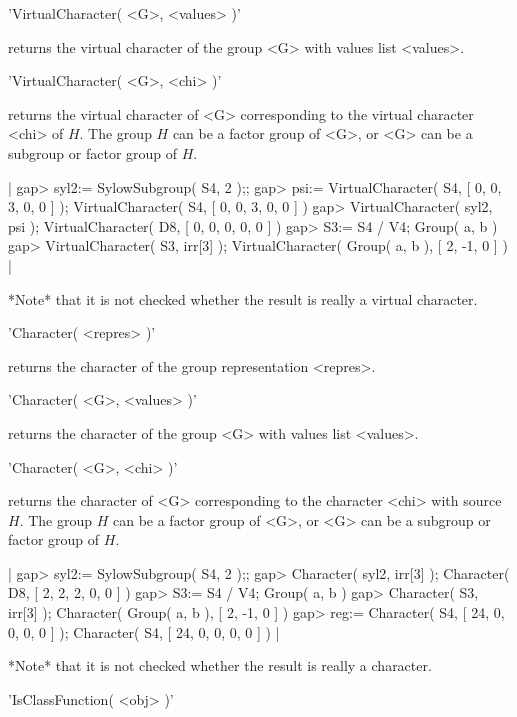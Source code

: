 
'VirtualCharacter( <G>, <values> )'

returns the virtual character of the group <G> with values list <values>.

'VirtualCharacter( <G>, <chi> )'

returns the virtual character of <G> corresponding to the virtual character
<chi> of $H$.  The group $H$ can be a factor group of <G>, or <G> can be
a subgroup or factor group of $H$.

|    gap> syl2:= SylowSubgroup( S4, 2 );;
    gap> psi:= VirtualCharacter( S4, [ 0, 0, 3, 0, 0 ] );
    VirtualCharacter( S4, [ 0, 0, 3, 0, 0 ] )
    gap> VirtualCharacter( syl2, psi );
    VirtualCharacter( D8, [ 0, 0, 0, 0, 0 ] )
    gap> S3:= S4 / V4;
    Group( a, b )
    gap> VirtualCharacter( S3, irr[3] );
    VirtualCharacter( Group( a, b ), [ 2, -1, 0 ] ) |

*Note* that it is not checked whether the result is really a virtual
character.


'Character( <repres> )'

returns the character of the group representation <repres>.

'Character( <G>, <values> )'

returns the character of the group <G> with values list <values>.

'Character( <G>, <chi> )'

returns the character of <G> corresponding to the character
<chi> with source $H$.
The group $H$ can be a factor group of <G>, or <G> can be
a subgroup or factor group of $H$.

|    gap> syl2:= SylowSubgroup( S4, 2 );;
    gap> Character( syl2, irr[3] );
    Character( D8, [ 2, 2, 2, 0, 0 ] )
    gap> S3:= S4 / V4;
    Group( a, b )
    gap> Character( S3, irr[3] );
    Character( Group( a, b ), [ 2, -1, 0 ] )
    gap> reg:= Character( S4, [ 24, 0, 0, 0, 0 ] );
    Character( S4, [ 24, 0, 0, 0, 0 ] ) |

*Note* that it is not checked whether the result is really a
character.


'IsClassFunction( <obj> )'

